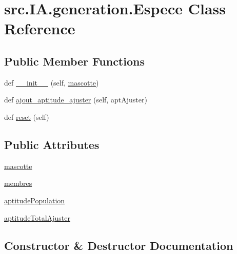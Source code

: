 \hypertarget{classsrc_1_1_i_a_1_1generation_1_1_espece}{}\section{src.\+I\+A.\+generation.\+Espece Class Reference}
\label{classsrc_1_1_i_a_1_1generation_1_1_espece}
\subsection*{Public Member Functions}
\begin{DoxyCompactItemize}
\item 
def \hyperlink{classsrc_1_1_i_a_1_1generation_1_1_espece_a242b549a5f7bd71ac2ad81dd149c0b90}{\+\_\+\+\_\+init\+\_\+\+\_\+} (self, \hyperlink{classsrc_1_1_i_a_1_1generation_1_1_espece_a5748e5a3543d4e3ebdcc56981f285f5f}{mascotte})
\item 
def \hyperlink{classsrc_1_1_i_a_1_1generation_1_1_espece_acad3e282587c6af38e5d4e6adbbcff7f}{ajout\+\_\+aptitude\+\_\+ajuster} (self, apt\+Ajuster)
\item 
def \hyperlink{classsrc_1_1_i_a_1_1generation_1_1_espece_adc4651cd3b27b03fdb3d3c45fcda58c4}{reset} (self)
\end{DoxyCompactItemize}
\subsection*{Public Attributes}
\begin{DoxyCompactItemize}
\item 
\hyperlink{classsrc_1_1_i_a_1_1generation_1_1_espece_a5748e5a3543d4e3ebdcc56981f285f5f}{mascotte}
\item 
\hyperlink{classsrc_1_1_i_a_1_1generation_1_1_espece_a1e2105d31625e972fde7c016978b7bb3}{membres}
\item 
\hyperlink{classsrc_1_1_i_a_1_1generation_1_1_espece_a92404cd84bd75c92fbcc3e2407484182}{aptitude\+Population}
\item 
\hyperlink{classsrc_1_1_i_a_1_1generation_1_1_espece_a7ba309a4604c67b845a92e85f72dd33b}{aptitude\+Total\+Ajuster}
\end{DoxyCompactItemize}


\subsection{Constructor \& Destructor Documentation}
\mbox{\label{classsrc_1_1_i_a_1_1generation_1_1_espece_a242b549a5f7bd71ac2ad81dd149c0b90}} 
